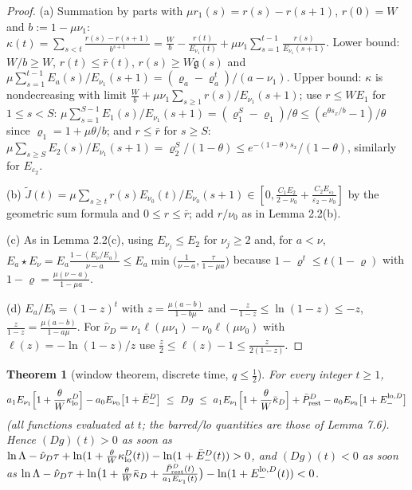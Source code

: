 \documentclass[11pt,a4paper]{article}
\newtheorem{theorem}{Theorem}[section]
\theoremstyle{definition}
\theoremstyle{remark}
\begin{document}
\begin{proof}
(a) Summation by parts with $\mu r_1(s)=r(s)-r(s+1)$, $r(0)=W$ and $b:=1-\mu\nu_1$: $\kappa(t)=\sum_{s<t}\frac{r(s)-r(s+1)}{b^{s+1}}=\frac Wb-\frac{r(t)}{E_{\nu_1}(t)}+\mu\nu_1\sum_{s=1}^{t-1}\frac{r(s)}{E_{\nu_1}(s+1)}$. Lower bound: $W/b\ge W$, $r(t)\le\bar r(t)$, $r(s)\ge W\mathfrak g(s)$ and $\mu\sum_{s=1}^{t-1}E_a(s)/E_{\nu_1}(s+1)=(\varrho_a-\varrho_a^t)/(a-\nu_1)$. Upper bound: $\kappa$ is nondecreasing with limit $\frac Wb+\mu\nu_1\sum_{s\ge1}r(s)/E_{\nu_1}(s+1)$; use $r\le WE_1$ for $1\le s<S$: $\mu\sum_{s=1}^{S-1}E_1(s)/E_{\nu_1}(s+1)=(\varrho_1^S-\varrho_1)/\theta\le(e^{\theta s_x/b}-1)/\theta$ since $\varrho_1=1+\mu\theta/b$; and $r\le\bar r$ for $s\ge S$: $\mu\sum_{s\ge S}E_2(s)/E_{\nu_1}(s+1)=\varrho_2^S/(1-\theta)\le e^{-(1-\theta)s_x}/(1-\theta)$, similarly for $E_{\varepsilon_2}$.

(b) $\tilde J(t)=\mu\sum_{s\ge t}r(s)E_{\nu_0}(t)/E_{\nu_0}(s+1)\in[0,\frac{C_1E_2}{2-\nu_0}+\frac{C_2E_{\varepsilon_2}}{\varepsilon_2-\nu_0}]$ by the geometric sum formula and $0\le r\le\bar r$; add $r/\nu_0$ as in Lemma 2.2(b).

(c) As in Lemma 2.2(c), using $E_{\nu_j}\le E_2$ for $\nu_j\ge2$ and, for $a<\nu$, $E_a\star E_\nu=E_a\frac{1-(E_\nu/E_a)}{\nu-a}\le E_a\min\bigl(\frac1{\nu-a},\frac{\tau}{1-\mu a}\bigr)$ because $1-\varrho^t\le t(1-\varrho)$ with $1-\varrho=\frac{\mu(\nu-a)}{1-\mu a}$.

(d) $E_a/E_b=(1-z)^t$ with $z=\frac{\mu(a-b)}{1-b\mu}$ and $-\frac{z}{1-z}\le\ln(1-z)\le-z$, $\frac{z}{1-z}=\frac{\mu(a-b)}{1-a\mu}$. For $\hat\nu_D=\nu_1\ell(\mu\nu_1)-\nu_0\ell(\mu\nu_0)$ with $\ell(z)=-\ln(1-z)/z$ use $\frac z2\le\ell(z)-1\le\frac{z}{2(1-z)}$.
\end{proof}

\begin{theorem}[{window theorem, discrete time, $q\le\frac12$}]
For every integer $t\ge1$,
\begin{equation*}
a_1E_{\nu_1}\Bigl[1+\frac\theta W\kappa^D_{\rm lo}\Bigr]-a_0E_{\nu_0}\bigl[1+\bar E^D_-\bigr]\ \le\ Dg\ \le\ a_1E_{\nu_1}\Bigl[1+\frac\theta W\bar\kappa_D\Bigr]+\bar P^D_{\rm rest}-a_0E_{\nu_0}\bigl[1+E_-^{{\rm lo},D}\bigr]
\end{equation*}
(all functions evaluated at $t$; the barred/lo quantities are those of Lemma 7.6). Hence $(Dg)(t)>0$ as soon as $\ln\Lambda-\hat\nu_D\tau+\ln(1+\frac\theta W\kappa^D_{\rm lo}(t))-\ln(1+\bar E_-^D(t))>0$, and $(Dg)(t)<0$ as soon as $\ln\Lambda-\hat\nu_D\tau+\ln\bigl(1+\frac\theta W\bar\kappa_D+\frac{\bar P^D_{\rm rest}(t)}{a_1E_{\nu_1}(t)}\bigr)-\ln(1+E_-^{{\rm lo},D}(t))<0$.
\end{theorem}
\end{document}
